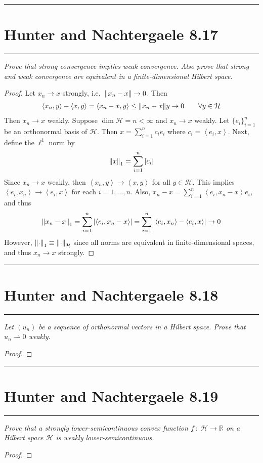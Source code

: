 \documentclass{article} %
\theoremstyle{plain}
\def\Rl{\mathbb{R}}
\newcommand{\VEC}[2]{\left\langle #1, #2 \right\rangle}
\newcommand{\Hilb}{\mathcal{H}}
\newcommand{\problem}[1]{
\vspace{.375cm}
\begin{minipage}{\textwidth}
    \begin{center}
        \noindent\rule{5cm}{1pt}
    \end{center}
    \section{\bf #1}
    \begin{center}
        \noindent\rule{5cm}{1pt}
    \end{center}
    \vspace{0.25cm}
\end{minipage}
}
\numberwithin{equation}{section} %
\numberwithin{figure}{section} %
\numberwithin{table}{section} %
\begin{document}
\problem{Hunter and Nachtergaele 8.17}
\emph{Prove that strong convergence implies weak convergence.  Also prove that strong and weak convergence are equivalent in a finite-dimensional Hilbert space.}

\begin{proof}
    Let $x_n \rightarrow x$ strongly, i.e.~$\norm{x_n - x} \rightarrow 0$.  Then
    \begin{align*}
        \VEC{x_n}{y} - \VEC{x}{y} = \VEC{x_n - x}{y} \leq \norm{x_n - x}{y} \rightarrow 0 \qquad \forall y \in \Hilb
    \end{align*}
    Then $x_n \rightarrow x$ weakly.  Suppose $\dim \Hilb = n < \infty$ and $x_n \rightarrow x$ weakly.  Let $\{e_i\}_{i=1}^n$ be an orthonormal basis of $\Hilb$.  Then $x = \sum_{i=1}^nc_ie_i$ where $c_i = \VEC{e_i}{x}$.  Next, define the $\ell^1$ norm by
    \begin{align*}
        \norm{x}_1 = \sum_{i=1}^n\left|c_i\right|
    \end{align*}
    Since $x_n \rightarrow x$ weakly, then $\VEC{x_n}{y} \rightarrow \VEC{x}{y}$ for all $y \in \Hilb$.  This implies $\VEC{e_i}{x_n} \rightarrow \VEC{e_i}{x}$ for each $i = 1, \dots, n$.  Also, $x_n - x = \sum_{i=1}^n \VEC{e_i}{x_n - x}e_i$, and thus
    \begin{align*}
        \norm{x_n - x}_1 = \sum_{i=1}^n \left|\VEC{e_i}{x_n - x}\right| = \sum_{i=1}^n \left|\VEC{e_i}{x_n} - \VEC{e_i}{x}\right| \rightarrow 0
    \end{align*}
    However, $\norm{\cdot}_1 \equiv \norm{\cdot}_\Hilb$ since all norms are equivalent in finite-dimensional spaces, and thus $x_n \rightarrow x$ strongly.
\end{proof}







\problem{Hunter and Nachtergaele 8.18}
\emph{Let $(u_n)$ be a sequence of orthonormal vectors in a Hilbert space.  Prove that $u_n \rightharpoonup 0$ weakly.}

\begin{proof}
\end{proof}







\problem{Hunter and Nachtergaele 8.19}
\emph{Prove that a strongly lower-semicontinuous convex function $f\ :\ \Hilb \rightarrow \Rl$ on a Hilbert space $\Hilb$ is weakly lower-semicontinuous.}

\begin{proof}
\end{proof}
\end{document}

